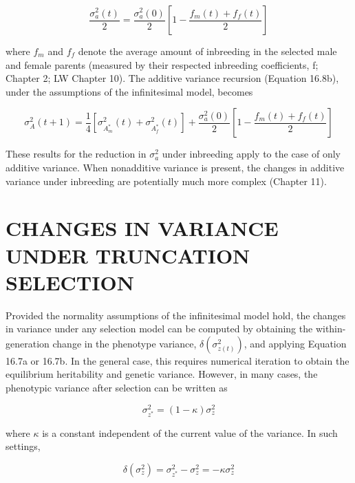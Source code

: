 \documentclass{article}
\begin{document}
\begin{equation}
\frac{\sigma_{a}^{2}(t)}{2}=\frac{\sigma_{a}^{2}(0)}{2}\left[1-\frac{f_{m}(t)+f_{f}(t)}{2}\right]
\tag{16.9c}
\label{eq:16_9c}
\end{equation}

where  $ f_{m} $ and  $ f_{f} $ denote the average amount of inbreeding in the selected male and female parents (measured by their respected inbreeding coefficients, f; Chapter 2; LW Chapter 10). The additive variance recursion (Equation 16.8b), under the assumptions of the infinitesimal model, becomes

\begin{equation}
\sigma_{A}^{2}(t+1)=\frac{1}{4}\left[\sigma_{A_{m}^{*}}^{2}(t)+\sigma_{A_{f}^{*}}^{2}(t)\right]+\frac{\sigma_{a}^{2}(0)}{2}\left[1-\frac{f_{m}(t)+f_{f}(t)}{2}\right]
\tag{16.9d}
\label{eq:16_9d}
\end{equation}

These results for the reduction in  $ \sigma_{a}^{2} $ under inbreeding apply to the case of only additive variance. When nonadditive variance is present, the changes in additive variance under inbreeding are potentially much more complex (Chapter 11).

\section{CHANGES IN VARIANCE UNDER TRUNCATION SELECTION}
Provided the normality assumptions of the infinitesimal model hold, the changes in variance under any selection model can be computed by obtaining the within-generation change in the phenotype variance,  $ \delta(\sigma_{z(t)}^{2}) $, and applying Equation 16.7a or 16.7b. In the general case, this requires numerical iteration to obtain the equilibrium heritability and genetic variance. However, in many cases, the phenotypic variance after selection can be written as

\begin{equation}
\sigma_{z^{*}}^{2}=\left(1-\kappa\right)\sigma_{z}^{2}
\tag{16.10a}
\label{eq:16_10a}
\end{equation}

where  $ \kappa $ is a constant independent of the current value of the variance. In such settings,

\begin{equation}
\delta\left(\sigma_{z}^{2}\right)=\sigma_{z^{*}}^{2}-\sigma_{z}^{2}=-\kappa\sigma_{z}^{2}
\tag{16.10b}
\label{eq:16_10b}
\end{equation}
\end{document}
